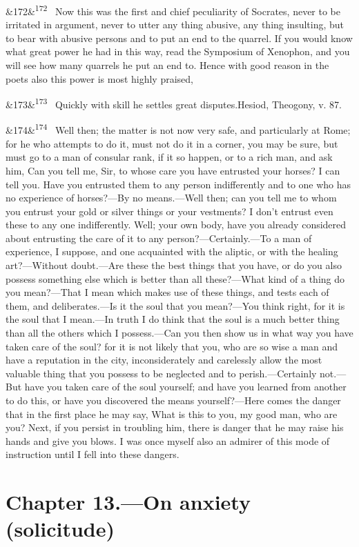 \documentclass[12pt]{article}
\newcommand{\para}[1][]{\par\noindent\ifx&#1&\else\textsuperscript{\footnotesize #1}~\fi}
\begin{document}
\para[172] Now this was the first and chief peculiarity of Socrates, never to be irritated in argument, never to utter any thing abusive, any thing insulting, but to bear with abusive persons and to put an end to the quarrel. If you would know what great power he had in this way, read the Symposium of Xenophon, and you will see how many quarrels he put an end to. Hence with good reason in the poets also this power is most highly praised,

\para[173] Quickly with skill he settles great disputes.Hesiod, Theogony, v. 87.

\para[174] Well then; the matter is not now very safe, and particularly at Rome; for he who attempts to do it, must not do it in a corner, you may be sure, but must go to a man of consular rank, if it so happen, or to a rich man, and ask him, Can you tell me, Sir, to whose care you have entrusted your horses? I can tell you. Have you entrusted them to any person indifferently and to one who has no experience of horses?—By no means.—Well then; can you tell me to whom you entrust your gold or silver things or your vestments? I don't entrust even these to any one indifferently. Well; your own body, have you already considered about entrusting the care of it to any person?—Certainly.—To a man of experience, I suppose, and one acquainted with the aliptic, or with the healing art?—Without doubt.—Are these the best things that you have, or do you also possess something else which is better than all these?—What kind of a thing do you mean?—That I mean which makes use of these things, and tests each of them, and deliberates.—Is it the soul that you mean?—You think right, for it is the soul that I mean.—In truth I do think that the soul is a much better thing than all the others which I possess.—Can you then show us in what way you have taken care of the soul? for it is not likely that you, who are so wise a man and have a reputation in the city, inconsiderately and carelessly allow the most valuable thing that you possess to be neglected and to perish.—Certainly not.—But have you taken care of the soul yourself; and have you learned from another to do this, or have you discovered the means yourself?—Here comes the danger that in the first place he may say, What is this to you, my good man, who are you? Next, if you persist in troubling him, there is danger that he may raise his hands and give you blows. I was once myself also an admirer of this mode of instruction until I fell into these dangers.

\section*{Chapter 13.---On anxiety (solicitude)}
\end{document}
